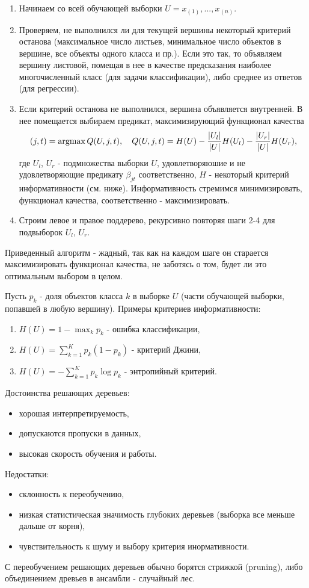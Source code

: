 \begin{enumerate}
    \item Начинаем со всей обучающей выборки $U = x_{(1)}, ..., x_{(n)}$.
    \item Проверяем, не выполнился ли для текущей вершины некоторый критерий останова (максимальное число листьев, минимальное число объектов в вершине, все объекты одного класса и пр.). Если это так, то объявляем вершину листовой, помещая в нее в качестве предсказания наиболее многочисленный класс (для задачи классификации), либо среднее из ответов (для регрессии).
    \item Если критерий останова не выполнился, вершина объявляется внутренней. В нее помещается выбираем предикат, максимизирующий функционал качества
$$
(j,t) = \operatorname*{argmax} Q(U, j, t), \quad Q(U, j, t) = H(U) - \frac{|U_l|}{|U|}H(U_l) - \frac{|U_r|}{|U|}H(U_r),
$$
где $U_l$, $U_r$ - подмножества выборки $U$, удовлетворяюшие и не удовлетворяющие предикату $\beta_{jt}$ соответственно, $H$ - некоторый критерий информативности (см. ниже). Информативность стремимся минимизировать, функционал качества, соответственно - максимизировать.
    \item Строим левое и правое поддерево, рекурсивно повторяя шаги 2-4 для подвыборок $U_l$, $U_r$.
\end{enumerate}

Приведенный алгоритм - жадный, так как на каждом шаге он старается максимизировать функционал качества, не заботясь о том, будет ли это оптимальным выбором в целом.

Пусть $p_k$ - доля объектов класса $k$ в выборке $U$ (части обучающей выборки, попавшей в любую вершину). Примеры критериев информативности:
\begin{enumerate}
    \item $H(U) = 1 - \max_k p_k$ - ошибка классификации,
    \item $H(U) = \sum_{k=1}^Kp_k(1 - p_k)$ - критерий Джини,
    \item $H(U) = -\sum_{k=1}^Kp_k\log p_k$ - энтропийный критерий.
\end{enumerate}
Достоинства решающих деревьев:
\begin{itemize}
    \item хорошая интерпретируемость,
    \item допускаются пропуски в данных,
    \item высокая скорость обучения и работы.
\end{itemize}
Недостатки:
\begin{itemize}
    \item склонность к переобучению,
    \item низкая статистическая значимость глубоких деревьев (выборка все меньше дальше от корня),
    \item чувствительность к шуму и выбору критерия инормативности.
\end{itemize}
С переобучением решающих деревьев обычно борятся стрижкой (pruning), либо объединением древьев в ансамбли - случайный лес.


